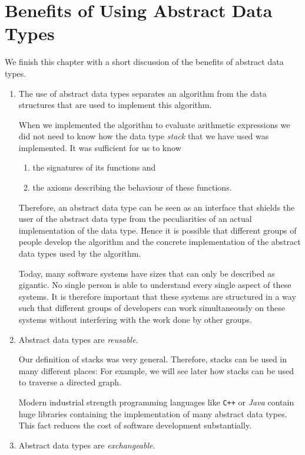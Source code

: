 \section[Benefits]{Benefits of Using Abstract Data Types}
We finish this chapter with a short discussion of the benefits of abstract data types.
 \begin{enumerate}
 \item The use of abstract data types separates an algorithm from the data structures that
       are used to implement this algorithm.

       When we implemented the algorithm to evaluate arithmetic expressions we did not need to know
       how the data type \emph{stack} that we have used was implemented.  It was sufficient for us to know 
       \begin{enumerate}
       \item the signatures of its functions and
       \item the axioms describing the behaviour of these functions.
       \end{enumerate}
       Therefore, an abstract data type can be seen as an interface that shields the user of the
       abstract data type from the peculiarities of an actual implementation of the data type.
       Hence it is possible that different groups of people develop the algorithm and the
       concrete implementation of the abstract data types used by the algorithm.  

       Today, many software systems have sizes that can only be described as gigantic.  No single
       person is able to understand every single aspect of these systems.  It is therefore important
       that these systems are structured in a way such that different groups of developers can work
       simultaneously on these systems without interfering with the work done by other groups.
 \item Abstract data types are \emph{reusable}.

       Our definition of stacks was very general.  Therefore, stacks can be used in many different
       places:  For example, we will see later how stacks can be used to traverse a directed graph.

       Modern industrial strength programming languages like \texttt{C++} or \textsl{Java} contain
       huge libraries containing the implementation of many abstract data types.  This fact reduces
       the cost of software development substantially.     
 \item Abstract data types are \emph{exchangeable}.


\end{enumerate}
